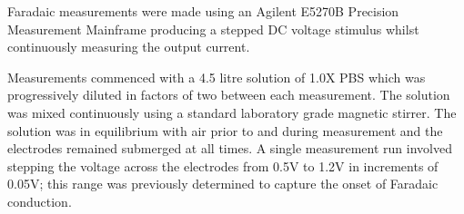 \documentclass[journal, a4paper]{IEEEtran}
\begin{document}
Faradaic measurements were made using an Agilent E5270B Precision Measurement Mainframe producing a stepped DC voltage stimulus whilst continuously measuring the output current. 

Measurements commenced with a 4.5 litre solution of 1.0X PBS which was progressively diluted in factors of two between each measurement. The solution was mixed continuously using a standard laboratory grade magnetic stirrer. The solution was in equilibrium with air prior to and during measurement and the electrodes remained submerged at all times.
A single measurement run involved stepping the voltage across the electrodes from 0.5\thinspace V to 1.2\thinspace V in increments of 0.05\thinspace V; this range was previously determined to capture the onset of Faradaic conduction.
\end{document}
